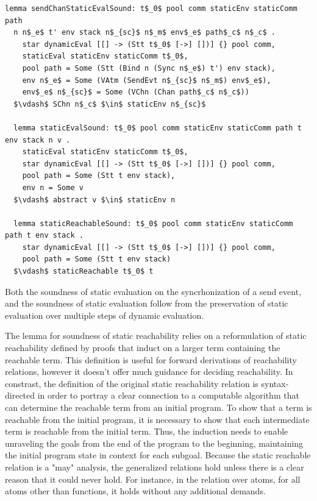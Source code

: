\documentclass[letterpaper, 11pt]{extarticle}
\begin{document}
\begin{lstlisting}[language=logic, mathescape]
  lemma sendChanStaticEvalSound: t$_0$ pool comm staticEnv staticComm path
  n n$_e$ t' env stack n$_{sc}$ n$_m$ env$_e$ path$_c$ n$_c$ .
    star dynamicEval [[] -> (Stt t$_0$ [->] [])] {} pool comm,
    staticEval staticEnv staticComm t$_0$,
    pool path = Some (Stt (Bind n (Sync n$_e$) t') env stack),
    env n$_e$ = Some (VAtm (SendEvt n$_{sc}$ n$_m$) env$_e$),
    env$_e$ n$_{sc}$ = Some (VChn (Chan path$_c$ n$_c$))
  $\vdash$ SChn n$_c$ $\in$ staticEnv n$_{sc}$

  lemma staticEvalSound: t$_0$ pool comm staticEnv staticComm path t env stack n v .
    staticEval staticEnv staticComm t$_0$, 
    star dynamicEval [[] -> (Stt t$_0$ [->] [])] {} pool comm,
    pool path = Some (Stt t env stack), 
    env n = Some v
  $\vdash$ abstract v $\in$ staticEnv n 

  lemma staticReachableSound: t$_0$ pool comm staticEnv staticComm path t env stack .
    star dynamicEval [[] -> (Stt t$_0$ [->] [])] {} pool comm,
    pool path = Some (Stt t env stack)
  $\vdash$ staticReachable t$_0$ t 
\end{lstlisting}

Both the soundness of static evaluation on the syncrhonization of a send event,
and the soundness of static evaluation follow from
the preservation of static evaluation over multiple steps of dynamic evaluation.

The lemma for soundness of static reachability relies on a reformulation of
static reachability defined by proofs that induct on a larger term
containing the reachable term. This definition is useful for forward derivations
of reachability relations, however it doesn't offer much guidance for deciding reachability. 
In constrast, the definition of the original static reachability relation is
syntax-directed in order to portray a clear connection to
a computable algorithm that can determine the reachable term from an initial program.
To show that a term is reachable from the initial program, it is necessary to
show that each intermediate term is reachable from the initial term. Thus, the
induction needs to enable unraveling the goals from the end of the program to the beginning,
maintaining the initial program state in context for each subgoal. Because the static
reachable relation is a "may" analysis, the generalized relations hold unless there is
a clear reason that it could never hold.
For instance, in the relation over atoms, for all atoms other than functions, 
it holds without any additional demands.
\end{document}
